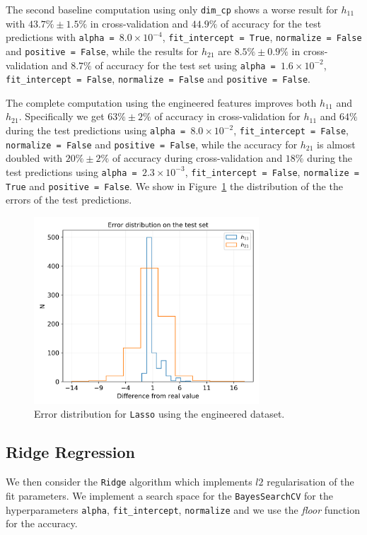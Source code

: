     The second baseline computation using only \texttt{dim\_cp} shows a worse result for $h_{11}$ with $43.7\% \pm 1.5\%$ in cross-validation and $44.9\%$ of accuracy for the test predictions with \texttt{alpha = $8.0 \times 10^{-4}$}, \texttt{fit\_intercept = True}, \texttt{normalize = False} and \texttt{positive = False}, while the results for $h_{21}$ are $8.5\% \pm 0.9\%$ in cross-validation and $8.7\%$ of accuracy for the test set using \texttt{alpha = $1.6 \times 10^{-2}$}, \texttt{fit\_intercept = False}, \texttt{normalize = False} and \texttt{positive = False}.
    
    The complete computation using the engineered features improves both $h_{11}$ and $h_{21}$. Specifically we get $63\% \pm 2\%$ of accuracy in cross-validation for $h_{11}$ and $64\%$ during the test predictions using \texttt{alpha = $8.0 \times 10^{-2}$}, \texttt{fit\_intercept = False}, \texttt{normalize = False} and \texttt{positive = False}, while the accuracy for $h_{21}$ is almost doubled with $20\% \pm 2\%$ of accuracy during cross-validation and $18\%$ during the test predictions using \texttt{alpha = $2.3 \times 10^{-3}$}, \texttt{fit\_intercept = False}, \texttt{normalize = True} and \texttt{positive = False}. We show in Figure~\ref{fig:lasso_err} the distribution of the the errors of the test predictions.
    
    \begin{figure}[t]
        \centering
        \includegraphics[width=0.75\textwidth]{tex/img/lasso_error_eng.png}
        \caption{Error distribution for \texttt{Lasso} using the engineered dataset.}
        \label{fig:lasso_err}
    \end{figure}
    
\subsection{Ridge Regression}
    We then consider the \texttt{Ridge} algorithm which implements $l2$ regularisation of the fit parameters. We implement a search space for the \texttt{BayesSearchCV} for the hyperparameters \texttt{alpha}, \texttt{fit\_intercept}, \texttt{normalize} and we use the \textit{floor} function for the accuracy.
    
